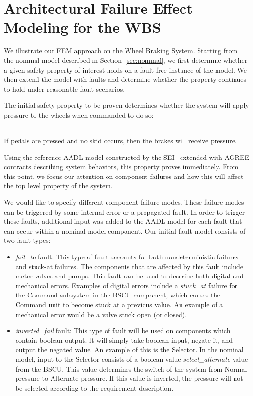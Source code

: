\section{Architectural Failure Effect Modeling for the WBS}

We illustrate our FEM approach on the Wheel Braking System.  Starting from the nominal model described in Section~\ref{sec:nominal}, we first determine whether a given safety property of interest holds on a fault-free instance of the model.  We then extend the model with faults and determine whether the property continues to hold under reasonable fault scenarios.

The initial safety property to be proven determines whether the system will apply pressure to the wheels when commanded to do so: 

\begin{tt} 
\  \\ 
If pedals are pressed and no skid occurs, then the brakes will receive pressure. \\
\end{tt}

\noindent Using the reference AADL model constructed by the SEI~\cite{SEI:AADL} extended with AGREE contracts describing system behaviors, this property proves immediately.  From this point, we focus our attention on component failures and how this will affect the top level property of the system.

We would like to specify different component failure modes. These failure modes can be triggered by some internal error or a propagated fault. In order to trigger these faults, additional input was added to the AADL model for each fault that can occur within a nominal model component. Our initial fault model consists of two fault types:

\begin{itemize}
\item \textit{fail\_to} fault: This type of fault accounts for both nondeterministic failures and stuck-at failures. The components that are affected by this fault include meter valves and pumps. This fault can be used to describe both digital and mechanical errors. Examples of digital errors include a \textit{stuck\_at} failure for the Command subsystem in the BSCU component, which causes the Command unit to become stuck at a previous value. An example of a mechanical error would be a valve stuck open (or closed). 


\item \textit{inverted\_fail} fault: This type of fault will be used on components which contain boolean output. It will simply take boolean input, negate it, and output the negated value. An example of this is the Selector. In the nominal model, input to the Selector consists of a boolean value \textit{select\_alternate} value from the BSCU. This value determines the switch of the system from Normal pressure to Alternate pressure. If this value is inverted, the pressure will not be selected according to the requirement description.  

\end{itemize}

